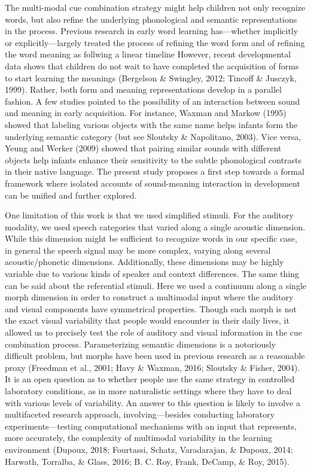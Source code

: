 \documentclass[english,floatsintext,man]{apa6}
\theoremstyle{definition}
\theoremstyle{definition}
\theoremstyle{definition}
\theoremstyle{remark}
\begin{document}
The multi-modal cue combination strategy might help children not only
recognize words, but also refine the underlying phonological and
semantic representations in the process. Previous research in early word
learning has---whether implicitly or explicitly---largely treated the
process of refining the word form and of refining the word meaning as
follwing a linear timeline However, recent developmental data shows that
children do not wait to have completed the acquisition of forms to start
learning the meanings (Bergelson \& Swingley, 2012; Tincoff \& Jusczyk,
1999). Rather, both form and meaning representations develop in a
parallel fashion. A few studies pointed to the possibility of an
interaction between sound and meaning in early acquisition. For
instance, Waxman and Markow (1995) showed that labeling various objects
with the same name helps infants form the underlying semantic category
(but see Sloutsky \& Napolitano, 2003). Vice versa, Yeung and Werker
(2009) showed that pairing similar sounds with different objects help
infants enhance their sensitivity to the subtle phonological contrasts
in their native language. The present study proposes a first step
towards a formal framework where isolated accounts of sound-meaning
interaction in development can be unified and further explored.

One limitation of this work is that we used simplified stimuli. For the
auditory modality, we used speech categories that varied along a single
acoustic dimension. While this dimension might be sufficient to
recognize words in our specific case, in general the speech signal may
be more complex, varying along several acoustic/phonetic dimensions.
Additionally, these dimensions may be highly variable due to various
kinds of speaker and context differences. The same thing can be said
about the referential stimuli. Here we used a continuum along a single
morph dimension in order to construct a multimodal input where the
auditory and visual components have symmetrical properties. Though such
morph is not the exact visual variability that people would encounter in
their daily lives, it allowed us to precisely test the role of auditory
and visual information in the cue combination process. Parameterizing
semantic dimensions is a notoriously difficult problem, but morphs have
been used in previous research as a reasonable proxy (Freedman et al.,
2001; Havy \& Waxman, 2016; Sloutsky \& Fisher, 2004). It is an open
question as to whether people use the same strategy in controlled
laboratory conditions, as in more naturalistic settings where they have
to deal with various levels of variability. An answer to this question
is likely to involve a multifaceted research approach,
involving---besides conducting laboratory experiments---testing
computational mechanisms with an input that represents, more accurately,
the complexity of multimodal variability in the learning environment
(Dupoux, 2018; Fourtassi, Schatz, Varadarajan, \& Dupoux, 2014; Harwath,
Torralba, \& Glass, 2016; B. C. Roy, Frank, DeCamp, \& Roy, 2015).
\end{document}
